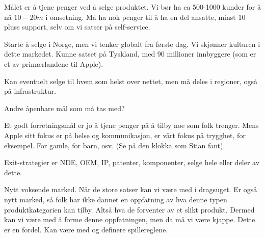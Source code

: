 



Målet er å tjene penger ved å selge produktet.
Vi bør ha ca 500-1000 kunder for å nå $10-20m$ i omsetning.
Må ha nok penger til å ha en del ansatte, minst 10 pluss support, selv om vi
satser på self-service.

Starte å selge i Norge, men vi tenker globalt fra første dag.
Vi skjønner kulturen i dette markedet. Kunne satset på Tyskland, med 90
millioner innbyggere (som er et av primærlandene til Apple).

Kan eventuelt selge til hvem som helst over nettet, men må deles i regioner,
også på infrastruktur.

Andre åpenbare mål som må tas med?

Et godt forretningsmål er jo å tjene penger på å tilby noe som folk trenger.
Mens Apple sitt fokus er på helse og kommunikasjon, er vårt fokus på trygghet,
for eksempel. For gamle, for barn, osv. (Se på den klokka som Stian fant).

Exit-strategier er NDE, OEM, IP, patenter, komponenter, selge hele eller deler
av dette.


Nytt voksende marked. Når de store satser kan vi være med i dragsuget. Er også
nytt marked, så folk har ikke dannet en oppfatning av hva denne typen
produktkategorien kan tilby. Altså hva de forventer av et slikt produkt. Dermed
kan vi være med å forme denne oppfatningen, men da må vi være kjappe. Dette er
en fordel. Kan være med og definere spillereglene.

